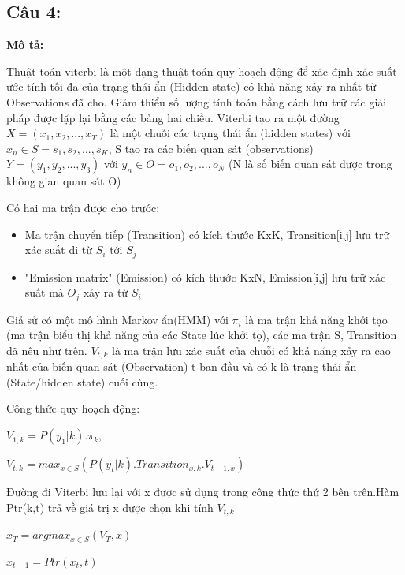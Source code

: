 \documentclass{article} %
\begin{document}
\begin{itemize}
\subsection*{Câu 4:}

\textbf{Mô tả:} 

\hspace{1cm}Thuật toán viterbi là một dạng thuật toán quy hoạch động để xác định xác suất ước tính tối đa của trạng thái ẩn (Hidden state) có khả năng xảy ra nhất từ Observations đã cho. Giảm thiểu số lượng tính toán bằng cách lưu trữ các giải pháp được lặp lại bằng các bảng hai chiều. Viterbi tạo ra một đường $X = (x_1,x_2,...,x_T)$ là một chuỗi các trạng thái ẩn (hidden states) với $x_n \in S = {s_1,s_2,...,s_K}$, S tạo ra các biến quan sát (observations) $Y = (y_1,y_2,...,y_3)$ với $y_n \in O = {o_1,o_2,...,o_N}$  (N là số biến quan sát được trong không gian quan sát O)

\hspace{1cm} Có hai ma trận được cho trước: 
\begin{itemize}
    \item Ma trận chuyển tiếp (Transition) có kích thước KxK, Transition[i,j] lưu trữ xác suất đi từ $S_i$ tới $S_j$
    
    \item "Emission matrix" (Emission) có kích thước KxN, Emission[i,j] lưu trữ xác suất mà $O_j$ xảy ra từ $ S_i$
\end{itemize}
 
 Giả sử có một mô hình Markov ẩn(HMM) với $\pi_i$ là ma trận khả năng khởi tạo (ma trận biểu thị khả năng của các State lúc khởi tọ), các ma trận S, Transition đã nêu như trên. $V_{t,k}$ là ma trận lưu xác suất của chuỗi có khả năng xảy ra cao nhất của biến quan sát (Observation) t ban đầu  và có k là trạng thái ẩn (State/hidden state) cuối cùng.
 
 Công thức quy hoạch động:
 
 \hspace{1cm} $V_{1,k} = P(y_1 | k).\pi_k,$
 
 \hspace{1cm} $V_{t,k} = max_{x \in S}(P(y_t | k).Transition_{x,k}.V_{t-1,x})$

Đường đi Viterbi  lưu lại với x được sử dụng trong công thức thứ 2 bên trên.Hàm Ptr(k,t) trả về giá trị x được chọn khi tính $V_{t,k}$

\hspace{1cm} $x_T = argmax_{x \in S}(V_T,x)$

\hspace{1cm} $x_{t-1} = Ptr(x_t,t)$


\end{itemize}
\end{document}

